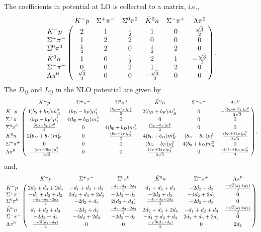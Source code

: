 \documentclass[a4paper]{article}
\begin{document}
The coefficients in potential at LO is collected to a matrix, i.e.,
\begin{equation}
	\bordermatrix{
    & K^-p & \Sigma^+\pi^- & \Sigma^0\pi^0 & \bar{K}^0n & \Sigma^-\pi^+ & \Lambda\pi^0 \cr
K^- p & 2 & 1 & \frac{1}{2} & 1 & 0 & \frac{\sqrt{3}}{2} \cr
\Sigma^+\pi^- & 1 & 2 & 2 & 0 & 0 & 0 \cr
\Sigma^0 \pi^0 & \frac{1}{2} & 2 & 0 & \frac{1}{2} & 2 & 0 \cr
\bar{K}^0n & 1 & 0 & \frac{1}{2} & 2 & 1 & -\frac{\sqrt{3}}{2} \cr
\Sigma^-\pi^+ & 0 & 0 & 2 & 1 & 2 & 0 \cr
\Lambda\pi^0 & \frac{\sqrt{3}}{2} & 0 & 0 & -\frac{\sqrt{3}}{2} & 0 & 0 \cr
}.
\end{equation}
The $D_{ij}$ and $L_{ij}$ in the NLO potential are given by
\begin{equation}
	\bordermatrix{
    & K^-p & \Sigma^+\pi^- & \Sigma^0\pi^0 & \bar{K}^0n & \Sigma^-\pi^+ & \Lambda\pi^0 \cr
K^-p & 4(b_0+b_D)m_K^2 & (b_D - b_F)\mu_1^2 & \frac{(b_D-b_F)\mu_1^2}{2} &2(b_D+b_F)m_K^2 & 0 & -\frac{(b_D+3b_F)\mu_1^2}{2\sqrt{3}} \cr
\Sigma^+\pi^- & (b_D-b_F)\mu_1^2 & 4(b_0+b_D)m_\pi^2 & 0 & 0 & 0 & 0 \cr
\Sigma^0\pi^0 & \frac{(b_D-b_F)\mu_1^2}{2} & 0 & 4(b_0+b_D)m_\pi^2 & \frac{(b_D-b_F)\mu_1^2}{2} & 0 & 0 \cr
\bar{K}^0n & 2(b_D+b_F)m_K^2 & 0 & \frac{(b_D-b_F)\mu_1^2}{2} & 4(b_0+b_D)m_K^2 & (b_D-b_F)\mu_1^2 & \frac{(b_D+3b_F)\mu_1^2}{2\sqrt{3}} \cr
\Sigma^-\pi^+ & 0 & 0 & 0 & (b_D-b_F)\mu_1^2 & 4(b_0+b_D)m_\pi^2 & 0 \cr
\Lambda\pi^0 & -\frac{(b_D+3b_F)\mu_1^2}{2\sqrt{3}} & 0 & 0 & \frac{(b_D+3b_F)\mu_1^2}{2\sqrt{3}} & 0 & \frac{4(3b_0+b_D)m_\pi^2}{3} \cr
},
\end{equation}
and,
\begin{equation}
	\bordermatrix{
    & K^- p & \Sigma^+\pi^- & \Sigma^0\pi^0 & \bar{K}^0n & \Sigma^-\pi^+ & \Lambda\pi^0 \cr
K^-p & 2d_2+d_3+2d_4 & -d_1+d_2+d_3 & \frac{-d_1-d_2+2d_3}{2} & d_1+d_2+d_3 & -2d_2+d_3 & \frac{-\sqrt{3}(d_1+d_2)}{2} \cr
\Sigma^+\pi^- & -d_1+d_2+d_3 & 2d_2+d_3+2d_4 & -2d_2+d_3 & -2d_2+d_3 & -4d_2+2d_3 & 0 \cr
\Sigma^0\pi^0 & \frac{-d_1-d_2+2d_3}{2} & -2d_2+d_3 & 2(d_3+d_4) & \frac{-d_1-d_2+2d_3}{2} & -2d_2+d_3 & 0 \cr
\bar{K}^0n & d_1+d_2+d_3 & -2d_2+d_3 & \frac{-d_1-d_2+2d_3}{2} & 2d_2+d_3+2d_4 & -d_1+d_2+d_3 & \frac{-\sqrt{3}(d_1+d_2)}{2} \cr
\Sigma^-\pi^+ & -2d_2+d_3 & -4d_2+2d_3 & -2d_2+d_3 & -d_1+d_2+d_3 & 2d_2+d_3+2d_4 & 0 \cr
\Lambda\pi^0 & \frac{-\sqrt{3}(d_1+d_2)}{2} & 0 & 0 & \frac{-\sqrt{3}(d_1+d_2)}{2} & 0 & 2d_4 \cr
}
\end{equation}
\end{document}
